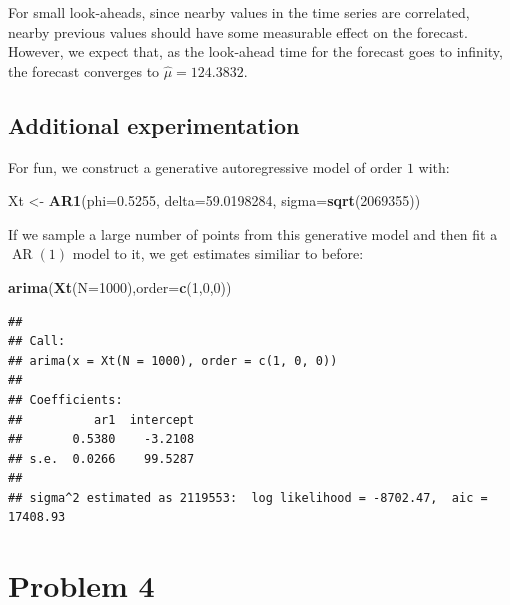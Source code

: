 \documentclass[
]{article}
\newenvironment{Shaded}{\begin{snugshade}}{\end{snugshade}}
\newcommand{\AttributeTok}[1]{\textcolor[rgb]{0.13,0.29,0.53}{#1}}
\newcommand{\DecValTok}[1]{\textcolor[rgb]{0.00,0.00,0.81}{#1}}
\newcommand{\FloatTok}[1]{\textcolor[rgb]{0.00,0.00,0.81}{#1}}
\newcommand{\FunctionTok}[1]{\textcolor[rgb]{0.13,0.29,0.53}{\textbf{#1}}}
\newcommand{\NormalTok}[1]{#1}
\newcommand{\OtherTok}[1]{\textcolor[rgb]{0.56,0.35,0.01}{#1}}
\begin{document}
For small look-aheads, since nearby values in the time series are
correlated, nearby previous values should have some measurable effect on
the forecast. However, we expect that, as the look-ahead time for the
forecast goes to infinity, the forecast converges to
\(\hat\mu = 124.3832\).

\hypertarget{additional-experimentation}{%
\subsection{Additional
experimentation}\label{additional-experimentation}}

For fun, we construct a generative autoregressive model of order \(1\)
with:

\begin{Shaded}
\begin{Highlighting}[]
\NormalTok{Xt }\OtherTok{\textless{}{-}} \FunctionTok{AR1}\NormalTok{(}\AttributeTok{phi=}\FloatTok{0.5255}\NormalTok{, }\AttributeTok{delta=}\FloatTok{59.0198284}\NormalTok{, }\AttributeTok{sigma=}\FunctionTok{sqrt}\NormalTok{(}\DecValTok{2069355}\NormalTok{))}
\end{Highlighting}
\end{Shaded}

If we sample a large number of points from this generative model and
then fit a \(\operatorname{AR}(1)\) model to it, we get estimates
similiar to before:

\begin{Shaded}
\begin{Highlighting}[]
\FunctionTok{arima}\NormalTok{(}\FunctionTok{Xt}\NormalTok{(}\AttributeTok{N=}\DecValTok{1000}\NormalTok{),}\AttributeTok{order=}\FunctionTok{c}\NormalTok{(}\DecValTok{1}\NormalTok{,}\DecValTok{0}\NormalTok{,}\DecValTok{0}\NormalTok{))}
\end{Highlighting}
\end{Shaded}

\begin{verbatim}
## 
## Call:
## arima(x = Xt(N = 1000), order = c(1, 0, 0))
## 
## Coefficients:
##          ar1  intercept
##       0.5380    -3.2108
## s.e.  0.0266    99.5287
## 
## sigma^2 estimated as 2119553:  log likelihood = -8702.47,  aic = 17408.93
\end{verbatim}

\hypertarget{problem-4}{%
\section{Problem 4}\label{problem-4}}
\end{document}
